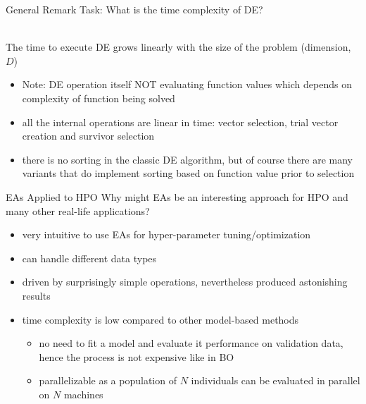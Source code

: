 \begin{frame}{General Remark}
Task: \hands [2min] \linebreak
What is the time complexity of DE?\\~\\
\pause

The time to execute DE grows linearly with the size of the problem (dimension, $D$)\\
\begin{itemize}
    \item Note: DE operation itself NOT evaluating function values which depends on complexity of function being solved\\     
    \item all the internal operations are linear in time: vector selection, trial vector creation and survivor selection
    \item there is no sorting in the classic DE algorithm, but of course there are many variants that do implement sorting based on function value prior to selection
\end{itemize}

\end{frame}

\begin{frame}{EAs Applied to HPO}
Why might EAs be an interesting approach for HPO and many other real-life applications?

\pause
\begin{itemize}
    \item very intuitive to use EAs for hyper-parameter tuning/optimization  
    \item can handle different data types
    \item driven by surprisingly simple operations, nevertheless produced astonishing results
    \item time complexity is low compared to other model-based methods
    \begin{itemize}
        \item no need to fit a model and evaluate it performance on validation data, hence the process is not expensive like in BO
        \item parallelizable as a population of $N$ individuals can be evaluated in parallel on $N$ machines  
    \end{itemize}
\end{itemize}

\end{frame}

